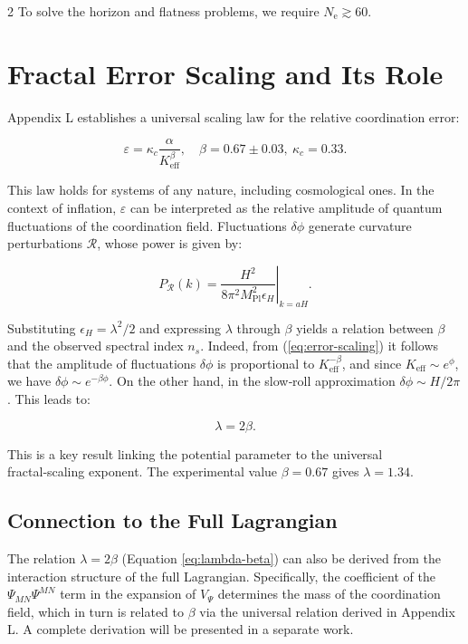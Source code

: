 \documentclass[12pt,a4paper]{article}
\newcommand{\eps}{\varepsilon}
\newcommand{\kappac}{\kappa_c}
\newcommand{\Keff}{K_{\mathrm{eff}}}
\newcommand{\Mpl}{M_{\mathrm{Pl}}}
\newcommand{\ninf}{N_{\mathrm{e}}}
\begin{document}
\begin{multicols}{2}
		To solve the horizon and flatness problems, we require \(\ninf \gtrsim 60\).
		
		\section{Fractal Error Scaling and Its Role}
		\label{sec:fractal}
		
		Appendix L establishes a universal scaling law for the relative coordination error:
		
		\begin{equation}
			\eps = \kappac \frac{\alpha}{\Keff^{\beta}}, \quad \beta = 0.67 \pm 0.03,\ \kappac = 0.33.
			\label{eq:error-scaling}
		\end{equation}
		
		This law holds for systems of any nature, including cosmological ones. In the context of inflation, \(\eps\) can be interpreted as the relative amplitude of quantum fluctuations of the coordination field. Fluctuations \(\delta \phi\) generate curvature perturbations \(\mathcal{R}\), whose power is given by:
		
		\begin{equation}
			P_{\mathcal{R}}(k) = \left. \frac{H^2}{8\pi^2 \Mpl^2 \epsilon_H} \right|_{k=aH}.
		\end{equation}
		
		Substituting \(\epsilon_H = \lambda^2/2\) and expressing \(\lambda\) through \(\beta\) yields a relation between \(\beta\) and the observed spectral index \(n_s\). Indeed, from (\ref{eq:error-scaling}) it follows that the amplitude of fluctuations \(\delta \phi\) is proportional to \(\Keff^{-\beta}\), and since \(\Keff \sim e^{\phi}\), we have \(\delta \phi \sim e^{-\beta \phi}\). On the other hand, in the slow‑roll approximation \(\delta \phi \sim H/2\pi\). This leads to:
		
		\begin{equation}
			\lambda = 2\beta.
			\label{eq:lambda-beta}
		\end{equation}
		
		This is a key result linking the potential parameter to the universal fractal‑scaling exponent. The experimental value \(\beta = 0.67\) gives \(\lambda = 1.34\).
		
		\subsection{Connection to the Full Lagrangian}
		
		The relation \(\lambda = 2\beta\) (Equation \ref{eq:lambda-beta}) can also be derived from the interaction structure of the full Lagrangian. Specifically, the coefficient of the \(\Psi_{MN}\Psi^{MN}\) term in the expansion of \(V_{\Psi}\) determines the mass of the coordination field, which in turn is related to \(\beta\) via the universal relation derived in Appendix L. A complete derivation will be presented in a separate work.
		

\end{multicols}
\end{document}
